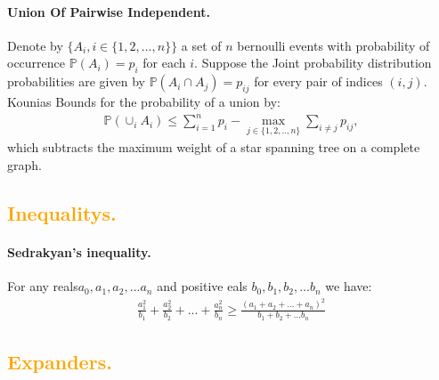 \documentclass{article}
\begin{document}
\begin{multicols*}{2}
  \paragraph{Union Of Pairwise Independent.}  Denote by $\{{A}_i, i \in \{1,2,...,n\}\}$ a set of  $n$ bernoulli events with probability of occurrence $\mathbb{P}(A_{i})=p_i$  for each $i$. Suppose the Joint probability distribution probabilities are given by $\mathbb{P}(A_{i} \cap A_{j})=p_{ij}$ for every pair of indices $(i,j)$. Kounias Bounds for the probability of a union by:
  \begin{equation*}
    \begin{split}
        \mathbb{P}(\displaystyle {\cup}_iA_{i}) \le  \sum_{i=1}^n p_{i}-\underset {j\in \{1,2,..,n\}}{\max} \sum_{i\neq j} p_{ij}, 
    \end{split}
  \end{equation*}
  which subtracts the maximum weight of a star spanning tree on a complete graph. 
  \subsection*{{\textcolor{orange}{Inequalitys.}} } 
  \paragraph{Sedrakyan's inequality.} For any reals$a_{0},a_{1},a_{2},\ldots a_{n}$ and positive eals $b_{0},b_{1},b_{2},\ldots b_{n}$ we have:  
  \begin{equation*}
    \begin{split}
      \frac{a_{1}^2}{b_{1}}+\frac{a_{2}^2}{b_{2}}+ ...+ \frac{a_{n}^2}{b_{n}} \ge \frac{\left( a_{1}+ a_{2} + ... + a_{n}  \right)^{2}}{b_{1}+b_{2}+... b_{n}}  
    \end{split}
  \end{equation*}
  \subsection*{{\textcolor{orange}{Expanders.}} } 

\end{multicols*}
\end{document}
